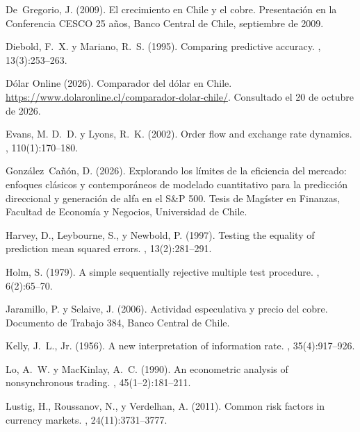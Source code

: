 \documentclass[11pt,a4paper]{article}
\begin{document}
\begin{thebibliography}{}
De~Gregorio, J. (2009).
\newblock El crecimiento en {C}hile y el cobre.
\newblock Presentación en la Conferencia CESCO 25 años, Banco Central de Chile, septiembre de 2009.

Diebold, F.~X. y Mariano, R.~S. (1995).
\newblock Comparing predictive accuracy.
, 13(3):253--263.

{Dólar Online} (2026).
\newblock Comparador del dólar en {C}hile.
\newblock \url{https://www.dolaronline.cl/comparador-dolar-chile/}. Consultado el 20 de octubre de 2026.

Evans, M. D.~D. y Lyons, R.~K. (2002).
\newblock Order flow and exchange rate dynamics.
, 110(1):170--180.

González~Cañón, D. (2026).
\newblock Explorando los límites de la eficiencia del mercado: enfoques
  clásicos y contemporáneos de modelado cuantitativo para la predicción
  direccional y generación de alfa en el {S\&P} 500.
\newblock Tesis de Magíster en Finanzas, Facultad de Economía y Negocios, Universidad de
  Chile.

Harvey, D., Leybourne, S., y Newbold, P. (1997).
\newblock Testing the equality of prediction mean squared errors.
, 13(2):281--291.

Holm, S. (1979).
\newblock A simple sequentially rejective multiple test procedure.
, 6(2):65--70.

Jaramillo, P. y Selaive, J. (2006).
\newblock Actividad especulativa y precio del cobre.
\newblock Documento de Trabajo 384, Banco Central de Chile.

Kelly, J.~L., Jr. (1956).
\newblock A new interpretation of information rate.
, 35(4):917--926.

Lo, A.~W. y MacKinlay, A.~C. (1990).
\newblock An econometric analysis of nonsynchronous trading.
, 45(1--2):181--211.

Lustig, H., Roussanov, N., y Verdelhan, A. (2011).
\newblock Common risk factors in currency markets.
, 24(11):3731--3777.


\end{thebibliography}
\end{document}
